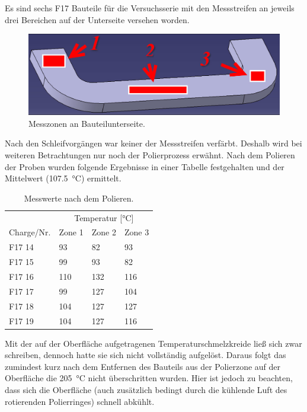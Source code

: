 \documentclass[12pt,a4paper,parskip,twoside,BCOR5mm,headsepline]{scrartcl}
\begin{document}
Es sind sechs F17 Bauteile für die Versuchsserie mit den Messstreifen an jeweils drei Bereichen auf der Unterseite versehen worden.
\begin{figure}[H]
\centering
\includegraphics[width=.8\textwidth]{messbereicheVDKDunterseite}
\caption{Messzonen an Bauteilunterseite.}
\label{messzonen}
\end{figure}

Nach den Schleifvorgängen war keiner der Messstreifen verfärbt. Deshalb wird bei weiteren Betrachtungen nur noch der Polierprozess erwähnt. Nach dem Polieren der Proben wurden folgende Ergebnisse in einer Tabelle festgehalten und der Mittelwert (\SI{107.5}{\degreeCelsius}) ermittelt.



\begin{table}[H]
\caption{Messwerte nach dem Polieren.}
\label{tab:messwerte}
\centering
\begin{tabular}{llll}
\toprule
              & \multicolumn{3}{c}{Temperatur [\si{\degreeCelsius}]}\\
              \cmidrule(ll){2-4}
 Charge/Nr. & Zone 1 & Zone 2 & Zone 3 \\
 \midrule
 F17 14 & 93 & 82 & 93 \\
 F17 15 & 99 & 93 & 82 \\
 F17 16 & 110 & 132 & 116 \\
 F17 17 & 99 & 127 & 104 \\
 F17 18 & 104 & 127 & 127 \\
 F17 19 & 104 & 127 & 116 \\
 \bottomrule             
\end{tabular}
\end{table}

Mit der auf der Oberfläche aufgetragenen Temperaturschmelzkreide ließ sich zwar schreiben, dennoch hatte sie sich nicht vollständig aufgelöst. Daraus folgt das zumindest kurz nach dem Entfernen des Bauteils aus der Polierzone auf der Oberfläche die \SI{205}{\degreeCelsius} nicht überschritten wurden. Hier ist jedoch zu beachten,  dass sich die Oberfläche (auch zusätzlich bedingt durch die kühlende Luft des rotierenden Polierringes) schnell abkühlt.
\end{document}
